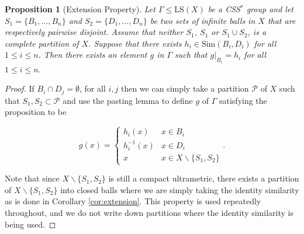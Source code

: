 \documentclass[10pt,a4paper]{amsart}
\newtheorem{proposition}{Proposition}
\begin{document}
\begin{proposition}[Extension Property]\label{prop:extension}
    Let $\Gamma \leq \text{LS}(X)$ be a CSS$^*$ group and let $S_1 =\{B_1, \dots , B_n\}$ and $S_2 = \{D_1, \dots , D_n\}$ be two sets of infinite balls in $X$ that are respectively pairwise disjoint. Assume that neither $S_1$, $S_1$ or $S_1 \cup S_2$, is a complete partition of $X$. Suppose that there exists $h_i \in \text{Sim}(B_i,D_i)$ for all $1 \leq i \leq n$. Then there exists an element $g$ in $\Gamma$ such that $g\vert_{B_i} = h_i$ for all $1 \leq i \leq n$.
\end{proposition}

\begin{proof}

    If $B_i \cap D_j = \emptyset$, for all $i,j$ then we can simply take a partition $\mathcal P$ of $X$ such that $S_1, S_2 \subset \mathcal P$ and use the pasting lemma to define $g$ of $\Gamma$ satisfying the proposition to be
    
    \[ g(x) = \begin{cases} h_i(x) & x \in B_i \\
    h_i^{-1}(x) & x \in D_i \\
    x & x \in X \backslash \{S_1, S_2\}
    \end{cases}.
    \]  

    Note that since $X \backslash \{S_1, S_2\}$ is still a compact ultrametric, there exists a partition of $X \backslash \{S_1, S_2\}$ into closed balls where we are simply taking the identity similarity as is done in Corollary \ref{cor:extension}. This property is used repeatedly throughout, and we do not write down partitions where the identity similarity is being used.
    


\end{proof}
\end{document}
